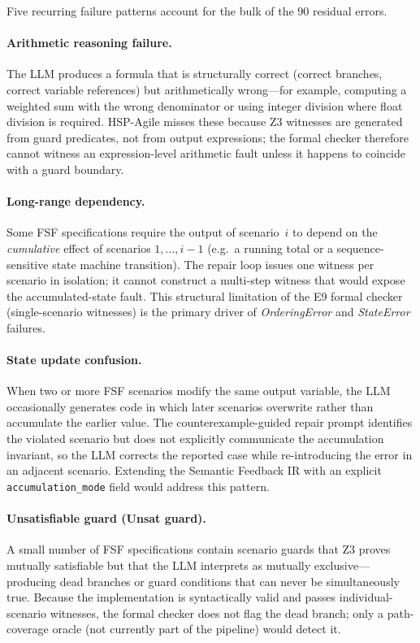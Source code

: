 Five recurring failure patterns account for the bulk of the 90 residual errors.

\paragraph{Arithmetic reasoning failure.}
The LLM produces a formula that is structurally correct (correct branches,
correct variable references) but arithmetically wrong---for example, computing a
weighted sum with the wrong denominator or using integer division where float
division is required.
HSP-Agile misses these because Z3 witnesses are generated from guard predicates,
not from output expressions; the formal checker therefore cannot witness an
expression-level arithmetic fault unless it happens to coincide with a guard
boundary.

\paragraph{Long-range dependency.}
Some FSF specifications require the output of scenario~$i$ to depend on the
\emph{cumulative} effect of scenarios $1, \ldots, i-1$ (e.g.\ a running total or
a sequence-sensitive state machine transition).
The repair loop issues one witness per scenario in isolation; it cannot construct
a multi-step witness that would expose the accumulated-state fault.
This structural limitation of the E9 formal checker (single-scenario witnesses)
is the primary driver of \emph{OrderingError} and \emph{StateError} failures.

\paragraph{State update confusion.}
When two or more FSF scenarios modify the same output variable, the LLM
occasionally generates code in which later scenarios overwrite rather than
accumulate the earlier value.
The counterexample-guided repair prompt identifies the violated scenario but does
not explicitly communicate the accumulation invariant, so the LLM corrects the
reported case while re-introducing the error in an adjacent scenario.
Extending the Semantic Feedback IR with an explicit \texttt{accumulation\_mode}
field would address this pattern.

\paragraph{Unsatisfiable guard (Unsat guard).}
A small number of FSF specifications contain scenario guards that Z3 proves
mutually satisfiable but that the LLM interprets as mutually exclusive---producing
dead branches or guard conditions that can never be simultaneously true.
Because the implementation is syntactically valid and passes individual-scenario
witnesses, the formal checker does not flag the dead branch; only a path-coverage
oracle (not currently part of the pipeline) would detect it.

